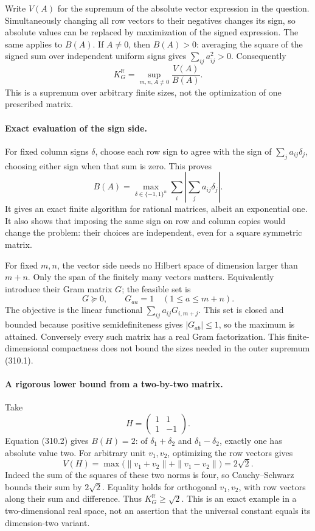 \documentclass[11pt]{article}
\begin{document}
Write $V(A)$ for the supremum of the absolute vector expression
in the question. Simultaneously changing all row vectors to their
negatives changes its sign, so absolute values can be replaced by
maximization of the signed expression. The same applies to $B(A)$.
If $A\ne0$, then $B(A)>0$: averaging the square of the signed sum
over independent uniform signs gives $\sum_{ij}a_{ij}^2>0$.
Consequently
\[
 K_G^{\mathbb R}=\sup_{m,n,A\ne0}\frac{V(A)}{B(A)}.
 \tag{310.1}
\]
This is a supremum over arbitrary finite sizes, not the optimization
of one prescribed matrix.

\paragraph{Exact evaluation of the sign side.}
For fixed column signs $\delta$, choose each row sign to agree
with the sign of $\sum_j a_{ij}\delta_j$, choosing either sign
when that sum is zero. This proves
\[
 B(A)=\max_{\delta\in\{-1,1\}^n}
              \sum_i\left|\sum_j a_{ij}\delta_j\right|.
 \tag{310.2}
\]
It gives an exact finite algorithm for rational matrices, albeit
an exponential one. It also shows that imposing the same sign on
row and column copies would change the problem: their choices are
independent, even for a square symmetric matrix.

For fixed $m,n$, the vector side needs no Hilbert space of dimension
larger than $m+n$. Only the span of the finitely many vectors
matters. Equivalently introduce their Gram matrix $G$; the feasible
set is
\[
 G\succeq0,\qquad G_{aa}=1\quad(1\leq a\leq m+n).
 \tag{310.3}
\]
The objective is the linear functional
$\sum_{ij}a_{ij}G_{i,m+j}$. This set is closed and bounded because
positive semidefiniteness gives $|G_{ab}|\leq1$, so the maximum is
attained. Conversely every such matrix has a real Gram factorization.
This finite-dimensional compactness does not bound the sizes needed
in the outer supremum (310.1).

\paragraph{A rigorous lower bound from a two-by-two matrix.}
Take
\[
 H=\begin{pmatrix}1&1\\1&-1\end{pmatrix}.
\]
Equation (310.2) gives $B(H)=2$: of $\delta_1+\delta_2$ and
$\delta_1-\delta_2$, exactly one has absolute value two.
For arbitrary unit $v_1,v_2$, optimizing the row vectors gives
\[
 V(H)=\max\bigl(\|v_1+v_2\|+\|v_1-v_2\|\bigr)=2\sqrt2.
 \tag{310.4}
\]
Indeed the sum of the squares of these two norms is four, so
Cauchy--Schwarz bounds their sum by $2\sqrt2$. Equality holds for
orthogonal $v_1,v_2$, with row vectors along their sum and difference.
Thus $K_G^{\mathbb R}\geq\sqrt2$. This is an exact example in a
two-dimensional real space, not an assertion that the universal
constant equals its dimension-two variant.
\end{document}
